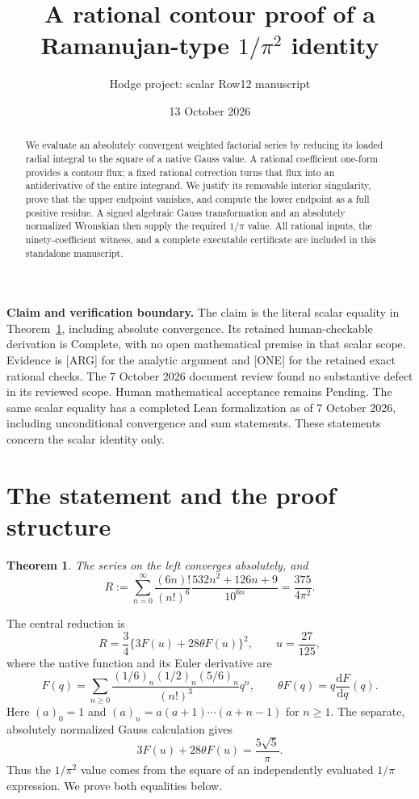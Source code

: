 \documentclass[11pt,a4paper]{article}
\title{A rational contour proof of a Ramanujan-type\texorpdfstring{ $1/\pi^2$}{ 1/pi squared} identity}
\author{Hodge project: scalar Row12 manuscript}
\date{13 October 2026}
\newtheorem{theorem}{Theorem}[section]
\newcommand{\dd}{\mathrm d}
\begin{document}
\maketitle
\begin{abstract}
We evaluate an absolutely convergent weighted factorial series by reducing
its loaded radial integral to the square of a native Gauss value.
A rational coefficient one-form provides a contour flux; a fixed rational
correction turns that flux into an antiderivative of the entire integrand.
We justify its removable interior singularity, prove that the upper endpoint
vanishes, and compute the lower endpoint as a full positive residue.
A signed algebraic Gauss transformation and an absolutely normalized
Wronskian then supply the required $1/\pi$ value. All rational inputs,
the ninety-coefficient witness, and a complete executable certificate are
included in this standalone manuscript.
\end{abstract}

\noindent\textbf{Claim and verification boundary.}
The claim is the literal scalar equality in Theorem~\ref{thm:main}, including
absolute convergence. Its retained human-checkable derivation is Complete,
with no open mathematical premise in that scalar scope. Evidence is [ARG]
for the analytic argument and [ONE] for the retained exact rational checks.
The 7 October 2026 document review found no substantive defect in its
reviewed scope. Human mathematical acceptance remains Pending.
The same scalar equality has a completed Lean formalization as of
7 October 2026, including unconditional convergence and sum statements.
These statements concern the scalar identity only.
\tableofcontents

\section{The statement and the proof structure}
\begin{theorem}\label{thm:main}
The series on the left converges absolutely, and
\begin{equation}\label{eq:main}
 R:=\sum_{n=0}^{\infty}\frac{(6n)!}{(n!)^6}
       \frac{532n^2+126n+9}{10^{6n}}
   =\frac{375}{4\pi^2}.
\end{equation}
\end{theorem}

The central reduction is
\begin{equation}\label{eq:central-reduction}
 R=\frac34\{3F(u)+28\theta F(u)\}^2,
 \qquad u=\frac{27}{125},
\end{equation}
where the native function and its Euler derivative are
\[
 F(q)=\sum_{n\geq0}\frac{(1/6)_n(1/2)_n(5/6)_n}{(n!)^3}q^n,
 \qquad \theta F(q)=q\frac{\dd F}{\dd q}(q).
\]
Here $(a)_0=1$ and $(a)_n=a(a+1)\cdots(a+n-1)$ for $n\geq1$.
The separate, absolutely normalized Gauss calculation gives
\begin{equation}\label{eq:overview-gauss}
 3F(u)+28\theta F(u)=\frac{5\sqrt5}{\pi}.
\end{equation}
Thus the $1/\pi^2$ value comes from the square of an independently
evaluated $1/\pi$ expression. We prove both equalities below.
\end{document}

